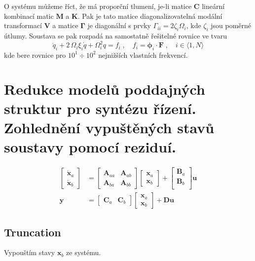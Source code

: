 \documentclass{article}
\begin{document}
	O systému můžeme říct, že má proporční tlumení, je-li matice $\bm{C}$ lineární kombinací matic $\bm{M}$ a $\bm{K}$. Pak je tato matice diagonalizovatelná modální transformací $\bm{V}$ a matice $\bm{\Gamma}$ je diagonální s prvky $\Gamma_{ii} = 2 \zeta_{i} \Omega_i$, kde $\zeta_i$ jsou poměrné útlumy. Soustava se pak rozpadá na samostatně řešitelné rovnice ve tvaru
	\begin{equation*}
		\ddot{q}_i + 2\,\Omega_i\xi_i \dot{q} + \Omega_i^2 q = f_i
		\;,\quad 
		f_i = \bm{\phi}_i \cdot \bm{F}
		\;,\quad 
		i \in \langle 1,N \rangle
	\end{equation*}
	kde bere rovnice pro $10^1 \div 10^2$ nejnižších vlastních frekvencí.

	\section{Redukce modelů poddajných struktur pro syntézu řízení. Zohlednění vypuštěných stavů soustavy pomocí reziduí.}
	\begin{align}
		\begin{bmatrix}
			\bm{\dot{x}}_a \\
			\bm{\dot{x}}_b
		\end{bmatrix}
		&=
		\begin{bmatrix}
			\bm{A}_{aa} & \bm{A}_{ab} \\
			\bm{A}_{ba} & \bm{A}_{bb}
		\end{bmatrix}
		\begin{bmatrix}
			\bm{x}_a \\
			\bm{x}_b
		\end{bmatrix}
		+
		\begin{bmatrix}
			\bm{B}_a \\
			\bm{B}_b \\
		\end{bmatrix}
		\bm{u}
		\\
		\bm{y}
		&=
		\begin{bmatrix}
			\bm{C}_a & \bm{C}_b
		\end{bmatrix}
		\begin{bmatrix}
			\bm{x}_a \\
			\bm{x}_b
		\end{bmatrix}
		+
		\bm{D}\bm{u}
	\end{align}

	\subsection{Truncation}
	Vypouštím stavy $\bm{x}_b$ ze systému.
\end{document}
